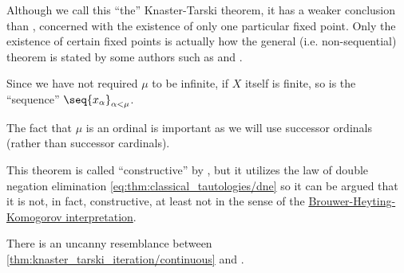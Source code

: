 \begin{comments}
  \item Although we call this \enquote{the} Knaster-Tarski theorem, it has a weaker conclusion than , concerned with the existence of only one particular fixed point. Only the existence of certain fixed points is actually how the general (i.e. non-sequential) theorem is stated by some authors such as  and .

  \item Since we have not required \( \mu \) to be infinite, if \( X \) itself is finite, so is the \enquote{sequence} \( \seq{ x_\alpha }_{\alpha < \mu} \).

  \item The fact that \( \mu \) is an ordinal is important as we will use successor ordinals (rather than successor cardinals).

  \item This theorem is called \enquote{constructive} by , but it utilizes the law of double negation elimination \eqref{eq:thm:classical_tautologies/dne} so it can be argued that it is not, in fact, constructive, at least not in the sense of the \hyperref[con:brouwer_heyting_kolmogorov_interpretation]{Brouwer-Heyting-Komogorov interpretation}.

  \item There is an uncanny resemblance between \cref{thm:knaster_tarski_iteration/continuous} and .
\end{comments}
